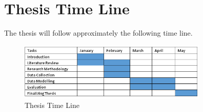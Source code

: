 \documentclass[12pt,a4paper,oneside,pdftex]{report}
\begin{document}
	\section{Thesis Time Line}
	\label{section:Time Line} 
	The thesis will follow approximately the following time line.
	
	\begin{figure}[ht]
		\begin{center}
			\includegraphics[width=9cm]{images/time.png}
			\caption{Thesis Time Line}
			\label{fig:Time Line}
		\end{center}
	\end{figure}
	
	
\end{document}
